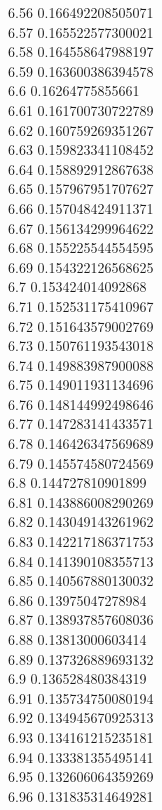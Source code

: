 {6.56	0.166492208505071\\
6.57	0.165522577300021\\
6.58	0.164558647988197\\
6.59	0.163600386394578\\
6.6	0.16264775855661\\
6.61	0.161700730722789\\
6.62	0.160759269351267\\
6.63	0.159823341108452\\
6.64	0.158892912867638\\
6.65	0.157967951707627\\
6.66	0.157048424911371\\
6.67	0.156134299964622\\
6.68	0.155225544554595\\
6.69	0.154322126568625\\
6.7	0.153424014092868\\
6.71	0.152531175410967\\
6.72	0.151643579002769\\
6.73	0.150761193543018\\
6.74	0.149883987900088\\
6.75	0.149011931134696\\
6.76	0.148144992498646\\
6.77	0.147283141433571\\
6.78	0.146426347569689\\
6.79	0.145574580724569\\
6.8	0.144727810901899\\
6.81	0.143886008290269\\
6.82	0.143049143261962\\
6.83	0.142217186371753\\
6.84	0.141390108355713\\
6.85	0.140567880130032\\
6.86	0.13975047278984\\
6.87	0.138937857608036\\
6.88	0.13813000603414\\
6.89	0.137326889693132\\
6.9	0.136528480384319\\
6.91	0.135734750080194\\
6.92	0.134945670925313\\
6.93	0.134161215235181\\
6.94	0.133381355495141\\
6.95	0.132606064359269\\
6.96	0.131835314649281\\
}

